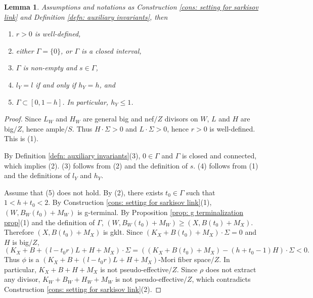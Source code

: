 \documentclass[11pt]{amsart}
\numberwithin{equation}{section}
\newcommand{\Ii}{{\Gamma}}
\newtheorem{lem}[thm]{Lemma}
\theoremstyle{definition}
\theoremstyle{remark}
\theoremstyle{definition}
\begin{document}
\begin{lem}\label{lem: sarkisov h<=1}
Assumptions and notations as Construction \ref{cons: setting for sarkisov link} and Definition \ref{defn: auxiliary invariants}, then 
\begin{enumerate}
\item $r>0$ is well-defined,
    \item either $\Ii=\{0\}$, or $\Ii$ is a closed interval,
    \item $\Ii$ is non-empty and $s\in\Ii$, 
    \item $l_Y=l$ if and only if $h_Y=h$, and
    \item $\Ii\subset [0,1-h]$. In particular, $h_Y\leq 1$.
\end{enumerate}
\end{lem}
\begin{proof}
Since $L_W$ and $H_W$ are general big and nef$/Z$ divisors on $W$, $L$ and $H$ are big$/Z$, hence ample$/S$. Thus $H\cdot\Sigma>0$ and $L\cdot\Sigma>0$, hence $r>0$ is well-defined. This is (1).

By Definition \ref{defn: auxiliary invariants}(3), $0\in\Ii$ and $\Ii$ is closed and connected, which implies (2). (3) follows from (2) and the definition of $s$. (4) follows from (1) and the definitions of $l_Y$ and $h_Y$.

Assume that (5) does not hold. By (2), there exists $t_0\in\Ii$ such that $1<h+t_0<2$. By Construction \ref{cons: setting for sarkisov link}(1), $(W,B_W(t_0)+M_W)$ is g-terminal. By Proposition \ref{prop: g terminalization prop}(1) and the definition of $\Ii$, $(W,B_W(t_0)+M_W)\geq (X,B(t_0)+M_X)$. Therefore $(X,B(t_0)+M_X)$ is gklt. Since $(K_X+B(t_0)+M_X)\cdot\Sigma=0$ and $H$ is big$/Z$, 
$$(K_X+B+(l-t_0r)L+H+M_X)\cdot\Sigma=((K_X+B(t_0)+M_X)-(h+t_0-1)H)\cdot\Sigma<0.$$
Thus $\phi$ is a $(K_X+B+(l-t_0r)L+H+M_X)$-Mori fiber space$/Z$. In particular, $K_X+B+H+M_X$ is not pseudo-effective$/Z$. Since $\rho$ does not extract any divisor, $K_W+B_W+H_W+M_W$ is not pseudo-effective$/Z$, which contradicts Construction \ref{cons: setting for sarkisov link}(2).
\end{proof}
\end{document}
